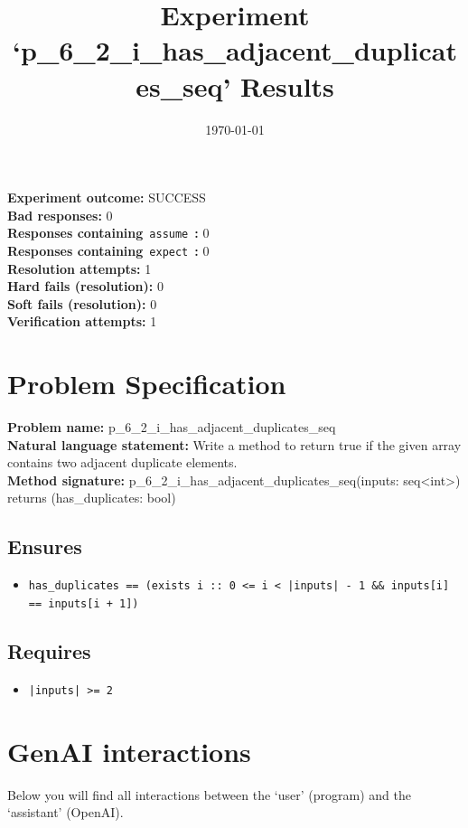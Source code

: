 \documentclass{article}
\begin{document}
\title{Experiment `p\_6\_2\_i\_has\_adjacent\_duplicates\_seq' Results}
\author{\today}
\date{}
\maketitle
\textbf{Experiment outcome: }SUCCESS
\\\textbf{Bad responses: }0
\\\textbf{Responses containing}~\texttt{assume}~\textbf{: }0
\\\textbf{Responses containing}~\texttt{expect}~\textbf{: }0
\\\textbf{Resolution attempts: }1
\\\textbf{Hard fails (resolution): }0
\\\textbf{Soft fails (resolution): }0
\\\textbf{Verification attempts: }1
\section*{Problem Specification}
\textbf{Problem name: }p\_6\_2\_i\_has\_adjacent\_duplicates\_seq
\\\textbf{Natural language statement: }Write a method to return true if the given array contains two adjacent duplicate elements.
\\\textbf{Method signature: }p\_6\_2\_i\_has\_adjacent\_duplicates\_seq(inputs: seq<int>) returns (has\_duplicates: bool)
\subsection*{Ensures}
\begin{itemize}
\item \texttt{has\_duplicates == (exists i :: 0 <= i < |inputs| - 1 \&\& inputs[i] == inputs[i + 1])}
\end{itemize}
\subsection*{Requires}
\begin{itemize}
\item \texttt{|inputs| >= 2}
\end{itemize}
\clearpage
\section*{GenAI interactions}
Below you will find all interactions between the `user' (program) and the `assistant' (OpenAI).
\end{document}
